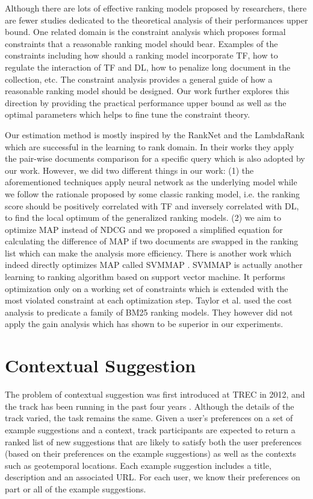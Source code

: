 Although there are lots of effective ranking models proposed by researchers, 
there are fewer studies dedicated to the theoretical analysis of their 
performances upper bound. One related domain is the constraint analysis 
\cite{Fang:2004:FSI:1008992.1009004} which proposes formal constraints 
that a reasonable ranking model should bear. Examples of the constraints 
including how should a ranking model incorporate TF, how to regulate 
the interaction of TF and DL, how to penalize long document in the 
collection, etc. The constraint analysis provides a general guide of how 
a reasonable ranking model should be designed. Our work further explores 
this direction by providing the practical performance upper bound as 
well as the optimal parameters which helps to fine tune the constraint 
theory. 

Our estimation method is mostly inspired by the RankNet 
\cite{export:68133,export:132652} and the LambdaRank 
\cite{export:132652,export:81144} which are 
successful in the learning to rank domain. 
In their works they apply the pair-wise documents comparison for a 
specific query which is also adopted by our work.
However, we did two different things in our work: 
(1) the aforementioned techniques apply neural network as the underlying 
model while we follow the rationale proposed by some classic ranking 
model, i.e. the ranking score should be positively correlated with TF and 
inversely correlated with DL, to find the local optimum of the generalized 
ranking models.
(2) we aim to optimize MAP instead of NDCG and we proposed a simplified 
equation for calculating the difference of MAP if two documents are 
swapped in the ranking list which can make the analysis more efficiency. 
There is another work which indeed directly optimizes MAP called SVMMAP 
\cite{Yue:2007:SVM:1277741.1277790}. SVMMAP is actually another learning 
to ranking algorithm based on support vector machine. It performs 
optimization only on a working set of constraints which is extended with 
the most violated constraint at each optimization step. 
Taylor et al. \cite{Taylor:2006:OMR:1183614.1183698} used the cost 
analysis to predicate a family of BM25 ranking models. They however 
did not apply the gain analysis which has shown to be superior in 
our experiments.


\section{Contextual Suggestion}

The problem of contextual suggestion was first introduced at
TREC in 2012, and the track has been running in the past 
four years \cite{adriel:overview, adriel:overview2013, adriel:overview2014, 
adriel:overview2015}. 
Although the details of the track varied, the task remains 
the same.  Given a user's preferences on a set of example 
suggestions and a context, track participants
are expected to return a ranked list of new suggestions that 
are likely to satisfy both the user preferences (based on their preferences
on the example suggestions) as well as the contexts such as 
geotemporal locations. Each example suggestion includes a title, 
description and an associated URL. For each user, we know their 
preferences on part or all of the example suggestions. 

